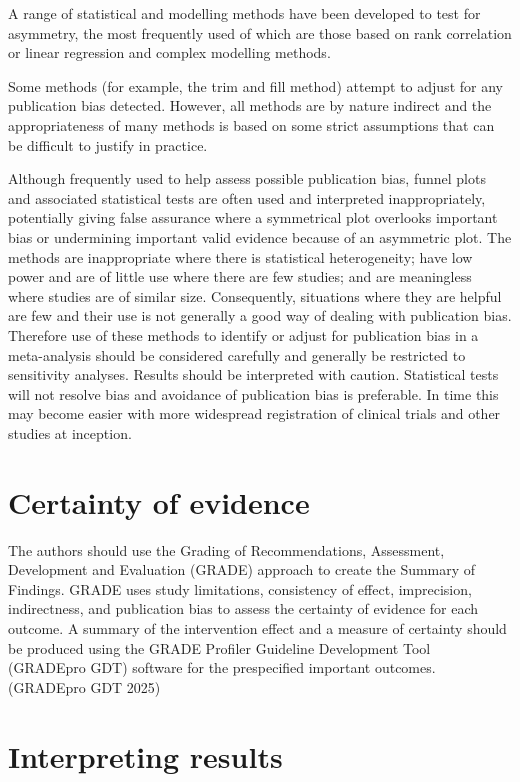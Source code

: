 \documentclass[
  10pt,
  a4paper,
  DIV=11,
  numbers=noendperiod]{scrreprt}
\begin{document}
A range of statistical and modelling methods have been developed to test
for asymmetry, the most frequently used of which are those based on rank
correlation or linear regression and complex modelling methods.

Some methods (for example, the trim and fill method) attempt to adjust
for any publication bias detected. However, all methods are by nature
indirect and the appropriateness of many methods is based on some strict
assumptions that can be difficult to justify in practice.

Although frequently used to help assess possible publication bias,
funnel plots and associated statistical tests are often used and
interpreted inappropriately, potentially giving false assurance where a
symmetrical plot overlooks important bias or undermining important valid
evidence because of an asymmetric plot. The methods are inappropriate
where there is statistical heterogeneity; have low power and are of
little use where there are few studies; and are meaningless where
studies are of similar size. Consequently, situations where they are
helpful are few and their use is not generally a good way of dealing
with publication bias. Therefore use of these methods to identify or
adjust for publication bias in a meta-analysis should be considered
carefully and generally be restricted to sensitivity analyses. Results
should be interpreted with caution. Statistical tests will not resolve
bias and avoidance of publication bias is preferable. In time this may
become easier with more widespread registration of clinical trials and
other studies at inception.

\section{Certainty of evidence}\label{certainty-of-evidence-1}

The authors should use the Grading of Recommendations, Assessment,
Development and Evaluation (GRADE) approach to create the Summary of
Findings. GRADE uses study limitations, consistency of effect,
imprecision, indirectness, and publication bias to assess the certainty
of evidence for each outcome. A summary of the intervention effect and a
measure of certainty should be produced using the GRADE Profiler
Guideline Development Tool (GRADEpro GDT) software for the prespecified
important outcomes. (GRADEpro GDT 2025)

\section{Interpreting results}\label{interpreting-results}
\end{document}
